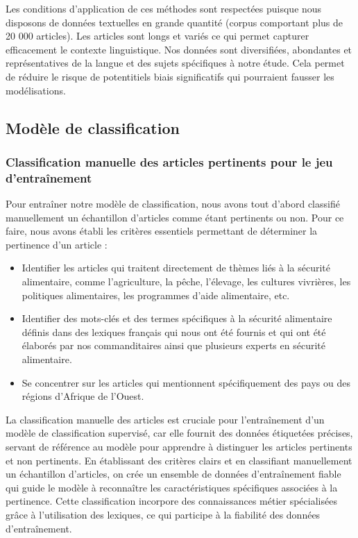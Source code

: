 \documentclass{article}
\begin{document}
Les conditions d’application de ces méthodes sont respectées puisque nous disposons de données textuelles en grande quantité (corpus comportant plus de 20 000 articles). Les articles sont longs et variés ce qui permet capturer efficacement le contexte linguistique. Nos données sont diversifiées, abondantes et représentatives de la langue et des sujets spécifiques à notre étude. Cela permet de réduire le risque de potentitiels biais significatifs qui pourraient fausser les modélisations.

\subsection{Modèle de classification}
\subsubsection{Classification manuelle des articles pertinents pour le jeu d'entraînement}
Pour entraîner notre modèle de classification, nous avons tout d'abord classifié manuellement un échantillon d'articles comme étant pertinents ou non. Pour ce faire, nous avons établi les critères essentiels permettant de déterminer la pertinence d'un article :
\begin{itemize}
    \item Identifier les articles qui traitent directement de thèmes liés à la sécurité alimentaire, comme l'agriculture, la pêche, l'élevage, les cultures vivrières, les politiques alimentaires, les programmes d'aide alimentaire, etc.
    \item Identifier des mots-clés et des termes spécifiques à la sécurité alimentaire définis dans des lexiques français qui nous ont été fournis et qui ont été élaborés par nos commanditaires ainsi que plusieurs experts en sécurité alimentaire.    
    \item Se concentrer sur les articles qui mentionnent spécifiquement des pays ou des régions d'Afrique de l'Ouest. \\
\end{itemize}

La classification manuelle des articles est cruciale pour l'entraînement d'un modèle de classification supervisé, car elle fournit des données étiquetées précises, servant de référence au modèle pour apprendre à distinguer les articles pertinents et non pertinents. En établissant des critères clairs et en classifiant manuellement un échantillon d'articles, on crée un ensemble de données d'entraînement fiable qui guide le modèle à reconnaître les caractéristiques spécifiques associées à la pertinence. Cette classification incorpore des connaissances métier spécialisées grâce à l'utilisation des lexiques, ce qui participe à la fiabilité des données d'entraînement.
\end{document}
